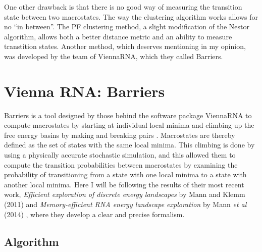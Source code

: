 One other drawback is that there is no good way of measuring the
transition state between two macrostates. The way the clustering
algorithm works allows for no ``in between''. The PF clustering
method, a slight modification of the Nestor algorithm, allows both a
better distance metric and an ability to measure transtition
states. Another method, which deserves mentioning in my opinion, was
developed by the team of ViennaRNA, which they called Barriers.

\section{Vienna RNA: Barriers}

Barriers is a tool designed by those behind the software package
ViennaRNA to compute macrostates by starting at individual local
minima and climbing up the free energy basins by making and breaking
pairs \cite{flamm2002barrier}
\cite{wolfinger2004efficient}. Macrostates are thereby defined as the
set of states with the same local minima. This climbing is done by
using a physically accurate stochastic simulation, and this allowed
them to compute the transition probabilities between macrostates by
examining the probability of transitioning from a state with one local
minima to a state with another local minima. Here I will be following
the results of their most recent work, \emph{Efficient exploration of
  discrete energy landscapes} by Mann and Klemm (2011) and
\emph{Memory-efficient RNA energy landscape exploration} by Mann
\emph{et al} (2014) \cite{PhysRevE.83.011113} \cite{mann2014memory},
where they develop a clear and precise formalism.

\subsection{Algorithm}

